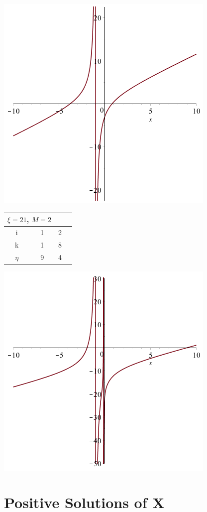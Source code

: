\documentclass[11pt]{article} %
\begin{document}
\begin{center}
\includegraphics[scale=.5]{plots/newtongraph3.png}\\
\begin{tabular}[b]{||c||c c c|}
\multicolumn{2}{c}{$\xi = 21$, $M = 2$} \\ 
\hline
i & 1 & 2  &  \\
\hline
k & 1 & 8 & \\
\hline
$\eta$ & 9 & 4 &  \\
\hline
\end{tabular}
\includegraphics[scale=.5]{plots/newtongraph4.png}
\end{center}
\section*{Positive Solutions of X}
\end{document}
